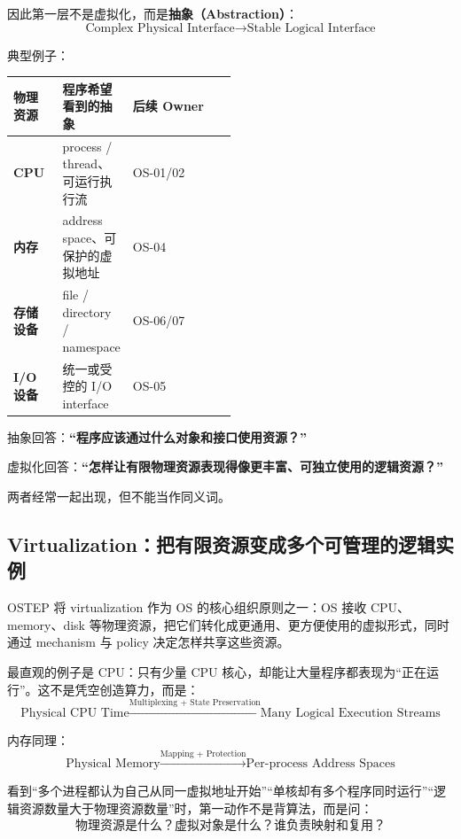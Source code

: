 \documentclass[11pt,a4paper]{ctexart}
\newcommand{\kw}[1]{\textbf{#1}}
\begin{document}
因此第一层不是虚拟化，而是\kw{抽象（Abstraction）}：
\[
\boxed{\text{Complex Physical Interface}\rightarrow\text{Stable Logical Interface}}
\]

典型例子：
\begin{center}
\begin{tabularx}{0.92\linewidth}{>{\bfseries}p{0.22\linewidth} p{0.28\linewidth} X}
\toprule
物理资源 & 程序希望看到的抽象 & 后续 Owner\\
\midrule
CPU & process / thread、可运行执行流 & OS-01/02\\
内存 & address space、可保护的虚拟地址 & OS-04\\
存储设备 & file / directory / namespace & OS-06/07\\
I/O 设备 & 统一或受控的 I/O interface & OS-05\\
\bottomrule
\end{tabularx}
\end{center}

\begin{warn}
抽象回答：\kw{“程序应该通过什么对象和接口使用资源？”}

虚拟化回答：\kw{“怎样让有限物理资源表现得像更丰富、可独立使用的逻辑资源？”}

两者经常一起出现，但不能当作同义词。
\end{warn}

\subsection{Virtualization：把有限资源变成多个可管理的逻辑实例}

OSTEP 将 virtualization 作为 OS 的核心组织原则之一：OS 接收 CPU、memory、disk 等物理资源，把它们转化成更通用、更方便使用的虚拟形式，同时通过 mechanism 与 policy 决定怎样共享这些资源。

最直观的例子是 CPU：只有少量 CPU 核心，却能让大量程序都表现为“正在运行”。这不是凭空创造算力，而是：
\[
\boxed{
\text{Physical CPU Time}
\xrightarrow{\text{Multiplexing + State Preservation}}
\text{Many Logical Execution Streams}
}
\]

内存同理：
\[
\boxed{
\text{Physical Memory}
\xrightarrow{\text{Mapping + Protection}}
\text{Per-process Address Spaces}
}
\]

\begin{exam}[题目信号]
看到“多个进程都认为自己从同一虚拟地址开始”“单核却有多个程序同时运行”“逻辑资源数量大于物理资源数量”时，第一动作不是背算法，而是问：
\[
\boxed{\text{物理资源是什么？虚拟对象是什么？谁负责映射和复用？}}
\]
\end{exam}
\end{document}
